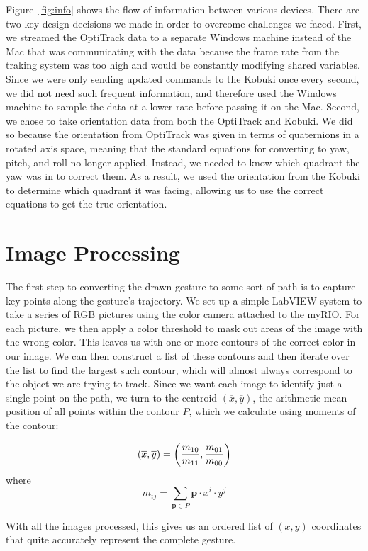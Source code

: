 \documentclass[10pt]{article}
\begin{document}
\begin{multicols*}{2}
  Figure~\ref{fig:info} shows the flow of information between various devices.
  There are two key design decisions we made in order to overcome challenges we
  faced. First, we streamed the OptiTrack data to a separate Windows machine
  instead of the Mac that was communicating with the data because the frame rate
  from the traking system was too high and would be constantly modifying shared
  variables. Since we were only sending updated commands to the Kobuki once
  every second, we did not need such frequent information, and therefore used
  the Windows machine to sample the data at a lower rate before passing it on
  the Mac. Second, we chose to take orientation data from both the OptiTrack and
  Kobuki. We did so because the orientation from OptiTrack was given in terms of
  quaternions in a rotated axis space, meaning that the standard equations for
  converting to yaw, pitch, and roll no longer applied. Instead, we needed to
  know which quadrant the yaw was in to correct them. As a result, we used the
  orientation from the Kobuki to determine which quadrant it was facing,
  allowing us to use the correct equations to get the true orientation.

  \section*{Image Processing}
  The first step to converting the drawn gesture to some sort of path is to
  capture key points along the gesture's trajectory. We set up a simple LabVIEW
  system to take a series of RGB pictures using the color camera attached to the
  myRIO. For each picture, we then apply a color threshold to mask out areas of
  the image with the wrong color. This leaves us with one or more contours of
  the correct color in our image. We can then construct a list of these contours
  and then iterate over the list to find the largest such contour, which will
  almost always correspond to the object we are trying to track. Since we want
  each image to identify just a single point on the path, we turn to the
  centroid $(\overline{x}, \overline{y})$, the arithmetic mean position of all
  points within the contour $P$, which we calculate using moments of the
  contour: \cite{centroid}

  $$(\overline{x}, \overline{y}) = \left(\frac{m_{10}}{m_{11}},
  \frac{m_{01}}{m_{00}}\right)$$
  where
  $$m_{ij} = \sum_{\mathbf{p} \in P} \mathbf{p} \cdot x^i \cdot y^j$$

  With all the images processed, this gives us an ordered list of $(x, y)$
  coordinates that quite accurately represent the complete gesture.


\end{multicols*}
\end{document}
